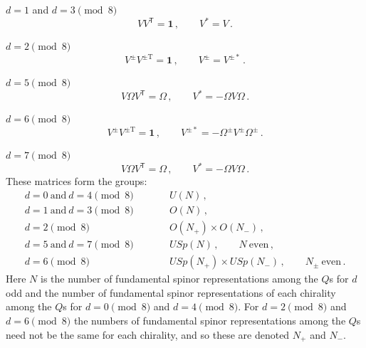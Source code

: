 \medskip
\noindent \(d=1\) and \(d=3\pmod 8\)
\begin{equation}
  VV^{\mathsf T}=\mathbf{1}\,,
  \qquad V^*=V\,.
  \tag{32.1.50}\label{eq:32.1.50}
\end{equation}

\medskip
\noindent \(d=2\pmod 8\)
\begin{equation}
  V^\pm V^{\pm\mathrm T}=\mathbf{1}\,,
  \qquad V^\pm=V^{\pm*}\,.
  \tag{32.1.51}\label{eq:32.1.51}
\end{equation}

\medskip
\noindent \(d=5\pmod 8\)
\begin{equation}
  V\Omega V^{\mathsf T}=\Omega\,,
  \qquad V^*=-\Omega V\Omega\,.
  \tag{32.1.52}\label{eq:32.1.52}
\end{equation}

\medskip
\noindent \(d=6\pmod 8\)
\begin{equation}
  V^\pm V^{\pm\mathrm T}=\mathbf{1}\,,
  \qquad V^{\pm*}=-\Omega^\pm V^\pm\Omega^\pm\,.
  \tag{32.1.53}\label{eq:32.1.53}
\end{equation}

\medskip
\noindent \(d=7\pmod 8\)
\begin{equation}
  V\Omega V^{\mathsf T}=\Omega\,,
  \qquad V^*=-\Omega V\Omega\,.
  \tag{32.1.54}\label{eq:32.1.54}
\end{equation}
These matrices form the groups:
\[
  \begin{array}{rcl}
    d=0\ \text{and}\ d=4\pmod 8
      &\qquad& U(N)\,,
    \\[4pt]
    d=1\ \text{and}\ d=3\pmod 8
      && O(N)\,,
    \\[4pt]
    d=2\pmod 8
      && O(N_+)\times O(N_-)\,,
    \\[4pt]
    d=5\ \text{and}\ d=7\pmod 8
      && USp(N)\,,\qquad N\ \text{even}\,,
    \\[4pt]
    d=6\pmod 8
      && USp(N_+)\times USp(N_-)\,,
         \qquad N_\pm\ \text{even}\,.
  \end{array}
\]
Here \(N\) is the number of fundamental spinor representations among the
\(Q\)s for \(d\) odd and the number of fundamental spinor representations
of each chirality among the \(Q\)s for \(d=0\pmod 8\) and
\(d=4\pmod 8\). For \(d=2\pmod 8\) and \(d=6\pmod 8\) the numbers of
fundamental spinor representations among the \(Q\)s need not be the same
for each chirality, and so these are denoted \(N_+\) and \(N_-\).

